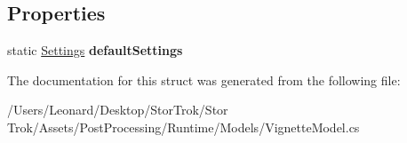 \subsection*{Properties}
\begin{DoxyCompactItemize}
\item 
\mbox{\label{struct_unity_engine_1_1_post_processing_1_1_vignette_model_1_1_settings_a7c1f4d2623dc2a4679a59de4c1d8ab11}} 
static \hyperlink{struct_unity_engine_1_1_post_processing_1_1_vignette_model_1_1_settings}{Settings} {\bfseries default\+Settings}
\end{DoxyCompactItemize}


The documentation for this struct was generated from the following file\+:\begin{DoxyCompactItemize}
\item 
/\+Users/\+Leonard/\+Desktop/\+Stor\+Trok/\+Stor Trok/\+Assets/\+Post\+Processing/\+Runtime/\+Models/Vignette\+Model.\+cs\end{DoxyCompactItemize}
